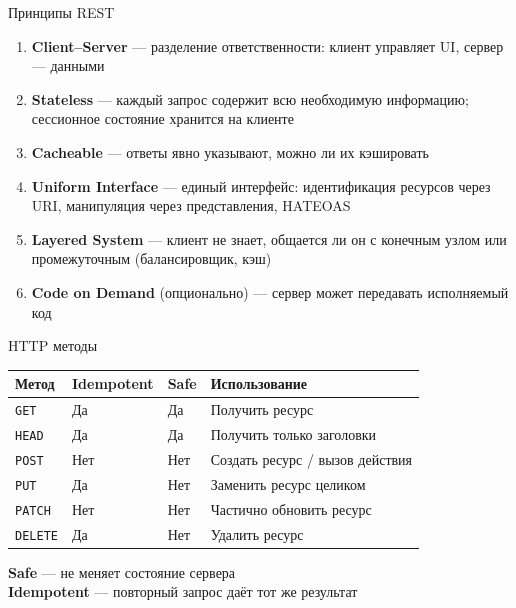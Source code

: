 \documentclass{beamer}
\begin{document}
\begin{frame}{Принципы REST}
\begin{enumerate}
  \item \textbf{Client--Server} --- разделение ответственности: клиент управляет UI, сервер --- данными
  \item \textbf{Stateless} --- каждый запрос содержит всю необходимую информацию; сессионное состояние хранится на клиенте
  \item \textbf{Cacheable} --- ответы явно указывают, можно ли их кэшировать
  \item \textbf{Uniform Interface} --- единый интерфейс: идентификация ресурсов через URI, манипуляция через представления, HATEOAS
  \item \textbf{Layered System} --- клиент не знает, общается ли он с конечным узлом или промежуточным (балансировщик, кэш)
  \item \textbf{Code on Demand} {\small (опционально)} --- сервер может передавать исполняемый код
\end{enumerate}
\end{frame}

\begin{frame}{HTTP методы}
\begin{center}
\begin{tabular}{llll}
\textbf{Метод} & \textbf{Idempotent} & \textbf{Safe} & \textbf{Использование} \\ \hline
\texttt{GET}    & Да  & Да  & Получить ресурс \\
\texttt{HEAD}   & Да  & Да  & Получить только заголовки \\
\texttt{POST}   & Нет & Нет & Создать ресурс / вызов действия \\
\texttt{PUT}    & Да  & Нет & Заменить ресурс целиком \\
\texttt{PATCH}  & Нет & Нет & Частично обновить ресурс \\
\texttt{DELETE} & Да  & Нет & Удалить ресурс \\
\end{tabular}
\end{center}
\vspace{0.3cm}
\textbf{Safe} --- не меняет состояние сервера \\
\textbf{Idempotent} --- повторный запрос даёт тот же результат
\end{frame}
\end{document}
